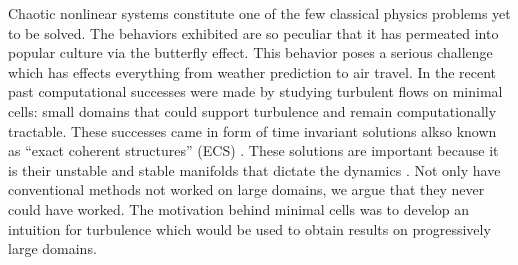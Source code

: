 


{}
Chaotic nonlinear systems constitute one of the few classical
physics problems yet to be solved. The behaviors exhibited are so peculiar
that it has permeated into popular culture via the butterfly effect.
This behavior poses a serious challenge which has
effects everything from weather prediction to
air travel. 
In the recent past computational successes were made
by studying turbulent flows on minimal cells: small domains that
could support turbulence and remain computationally tractable.
These successes came in form of time invariant solutions
alkso known as ``exact coherent structures''
(ECS) . These solutions are important because it
is their unstable and stable manifolds that dictate the dynamics .
Not only have conventional methods not worked on large domains, we argue that
they never could have worked. The motivation behind minimal cells was to
develop an intuition for turbulence which would be used to obtain results
on progressively large domains. 


